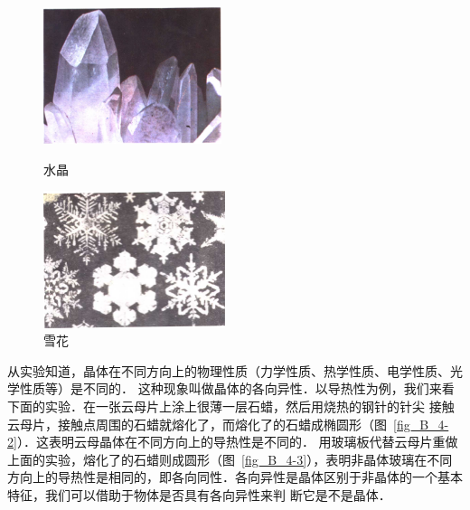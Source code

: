 \begin{figure}[htbp]
	\centering
	\begin{minipage}[t]{0.48\linewidth}
		\centering
		\includegraphics[height=4cm]{fig/B/0-3.png}
		\caption{水晶}\label{fig_B_0-3}
	\end{minipage}
	\begin{minipage}[t]{0.48\linewidth}
		\centering
		\includegraphics[height=4cm]{fig/B/0-2.png}
		\caption{雪花}\label{fig_B_0-2}
	\end{minipage}
\end{figure}




从实验知道，晶体在不同方向上的物理性质（力学性质、热学性质、电学性质、光学性质等）是不同的．
这种现象叫做晶体的各向异性．以导热性为例，我们来看下面的实验．在一张云母片上涂上很薄一层石蜡，然后用烧热的钢针的针尖
接触云母片，接触点周围的石蜡就熔化了，而熔化了的石蜡成椭圆形（图~\ref{fig_B_4-2}）．这表明云母晶体在不同方向上的导热性是不同的．
用玻璃板代替云母片重做上面的实验，熔化了的石蜡则成圆形（图~\ref{fig_B_4-3}），表明非晶体玻璃在不同方向上的导热性是相同的，即各向同性．各向异性是晶体区别于非晶体的一个基本特征，我们可以借助于物体是否具有各向异性来判
断它是不是晶体．

